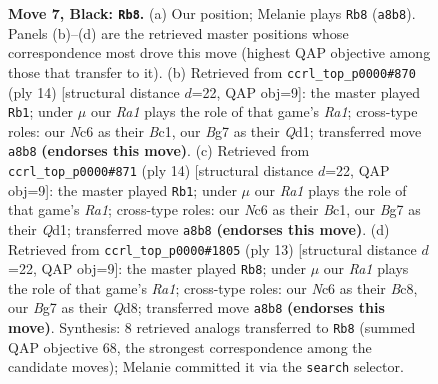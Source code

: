 \documentclass[11pt]{article}
\begin{document}
\begin{figure}[p]
\caption{\textbf{Move 7, Black: \texttt{Rb8}.} (a) Our position; Melanie plays \texttt{Rb8} (\texttt{a8b8}). Panels (b)--(d) are the retrieved master positions whose correspondence most drove this move (highest QAP objective among those that transfer to it). (b) Retrieved from \texttt{ccrl\_top\_p0000\#870} (ply 14) [structural distance $d$=22, QAP obj=9]: the master played \texttt{Rb1}; under $\mu$ our \emph{Ra1} plays the role of that game's \emph{Ra1}; cross-type roles: our \emph{N}c6 as their \emph{B}c1, our \emph{B}g7 as their \emph{Q}d1; transferred move \texttt{a8b8} \textbf{(endorses this move)}. (c) Retrieved from \texttt{ccrl\_top\_p0000\#871} (ply 14) [structural distance $d$=22, QAP obj=9]: the master played \texttt{Rb1}; under $\mu$ our \emph{Ra1} plays the role of that game's \emph{Ra1}; cross-type roles: our \emph{N}c6 as their \emph{B}c1, our \emph{B}g7 as their \emph{Q}d1; transferred move \texttt{a8b8} \textbf{(endorses this move)}. (d) Retrieved from \texttt{ccrl\_top\_p0000\#1805} (ply 13) [structural distance $d$=22, QAP obj=9]: the master played \texttt{Rb8}; under $\mu$ our \emph{Ra1} plays the role of that game's \emph{Ra1}; cross-type roles: our \emph{N}c6 as their \emph{B}c8, our \emph{B}g7 as their \emph{Q}d8; transferred move \texttt{a8b8} \textbf{(endorses this move)}. Synthesis: 8 retrieved analogs transferred to \texttt{Rb8} (summed QAP objective 68, the strongest correspondence among the candidate moves); Melanie committed it via the \texttt{search} selector.}
\label{fig:thought-m13}
\end{figure}

\clearpage
\end{document}
